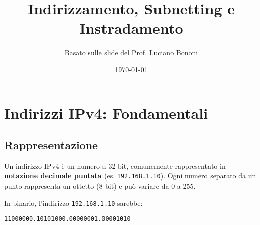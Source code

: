 


\title{Indirizzamento, Subnetting e Instradamento}
\author{Basato sulle slide del Prof. Luciano Bononi}
\date{\today}



\maketitle
\tableofcontents
\newpage

\section{Indirizzi IPv4: Fondamentali}

\subsection{Rappresentazione}
Un indirizzo IPv4 è un numero a 32 bit, comunemente rappresentato in \textbf{notazione decimale puntata} (es. \texttt{192.168.1.10}). Ogni numero separato da un punto rappresenta un ottetto (8 bit) e può variare da 0 a 255.

In binario, l'indirizzo \texttt{192.168.1.10} sarebbe:
\begin{verbatim}
11000000.10101000.00000001.00001010
\end{verbatim}

